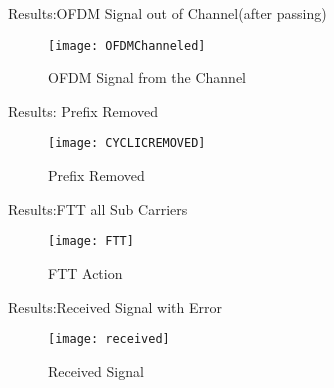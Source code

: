 \documentclass[]{beamer}
\begin{document}
\begin{frame}{Results:OFDM Signal out of Channel(after passing)}
	\begin{figure}
\centering
\texttt{[image: OFDMChanneled]}
\caption{OFDM Signal from the Channel}
\label{fig:OFDMChanneled}
\end{figure}
\end{frame}
\begin{frame}{Results: Prefix Removed}
	\begin{figure}
\centering
\texttt{[image: CYCLICREMOVED]}
\caption{Prefix Removed}
\label{fig:CYCLICREMOVED}
\end{figure}	
\end{frame}
\begin{frame}{Results:FTT all Sub Carriers}
	\begin{figure}
\centering
\texttt{[image: FTT]}
\caption{FTT Action}
\label{fig:FTT}
\end{figure}	
\end{frame}
\begin{frame}{Results:Received Signal with Error}
	\begin{figure}
\centering
\texttt{[image: received]}
\caption{Received Signal}
\label{fig:received}
\end{figure}
\end{frame}	
\end{document}
